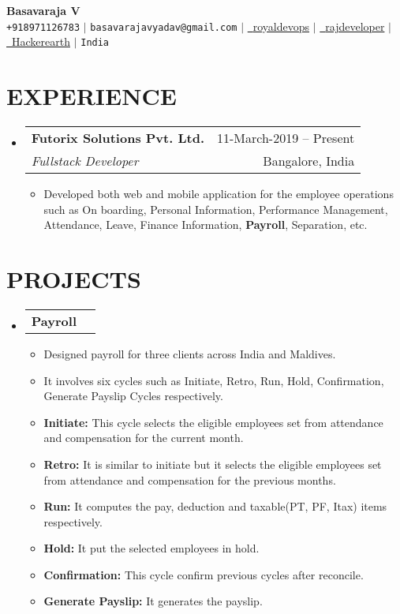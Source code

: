 \documentclass[letterpaper,11pt]{article}
\makeatletter
\newcommand{\resumeItem}[1]{
  \item\small{
    {#1 \vspace{-1pt}}
  }
}
\newcommand{\resumeSubheading}[4]{
  \vspace{-1pt}\item
    \begin{tabular*}{\textwidth}[t]{l@{\extracolsep{\fill}}r}
      \textbf{#1} & {\color{dark-grey}\small #2}\vspace{1pt}\\ %
      \textit{#3} & {\color{dark-grey} \small #4}\\ %
    \end{tabular*}\vspace{-4pt}
}
\newcommand{\resumeProjectHeading}[2]{
    \item
    \begin{tabular*}{\textwidth}{l@{\extracolsep{\fill}}r}
      #1 & {\color{dark-grey}} \\
    \end{tabular*}\vspace{-4pt}
}
\newcommand{\resumeSubHeadingListStart}{\begin{itemize}[leftmargin=0in, label={}]}
\newcommand{\resumeSubHeadingListEnd}{\end{itemize}}
\newcommand{\resumeItemListStart}{\begin{itemize}}
\newcommand{\resumeItemListEnd}{\end{itemize}\vspace{0pt}}
\makeatother
\begin{document}
\begin{center}
    \textbf{\Huge Basavaraja V} \\ \vspace{5pt}
    \small \faPhone* \texttt{+918971126783} \hspace{1pt} $|$
    \hspace{1pt} \faEnvelope \hspace{2pt} \texttt{basavarajavyadav@gmail.com} \hspace{1pt} $|$ 
    \href{https://linkedin.com/in//}{\raisebox{-0.2\height}\faLinkedin\ {royaldevops}} $|$
    \href{https://github.com/}{\raisebox{-0.2\height}\faGithub\ {rajdeveloper}} $|$
     \href{https://www.hackerearth.com/@basavarajav/}{\raisebox{-0.2\height}\ {Hackerearth}} $|$
    \hspace{1pt} \faMapMarker* \hspace{2pt}\texttt{India}
    \\ \vspace{-3pt}
\end{center}

\section{EXPERIENCE}
  \resumeSubHeadingListStart

    \resumeSubheading
      {Futorix Solutions Pvt. Ltd.}{11-March-2019 -- Present}
      {Fullstack Developer}{Bangalore, India}
      \resumeItemListStart
        \resumeItem{Developed both web and mobile application for the employee operations such as On boarding, Personal Information, Performance Management, Attendance, Leave, Finance Information, \textbf{Payroll}, Separation, etc.}
      \resumeItemListEnd
  \resumeSubHeadingListEnd


\section{PROJECTS}
    \resumeSubHeadingListStart
      \resumeProjectHeading
          {\textbf{Payroll}} {}
          \resumeItemListStart
            \resumeItem{Designed payroll for three clients across India and Maldives.}
            \resumeItem{It involves six cycles such as Initiate, Retro, Run, Hold, Confirmation, Generate Payslip Cycles respectively.}
            \resumeItem{\textbf{Initiate:} This cycle selects the eligible employees set from attendance and compensation for the current month.}
            \resumeItem{\textbf{Retro:} It is similar to initiate but it selects the eligible employees set from attendance and compensation for the previous months.}
            \resumeItem{\textbf{Run:} It computes the pay, deduction and taxable(PT, PF, Itax) items respectively.}
            \resumeItem{\textbf{Hold:} It put the selected employees in hold.}
            \resumeItem{\textbf{Confirmation:} This cycle confirm previous cycles after reconcile.}
            \resumeItem{\textbf{Generate Payslip:} It generates the payslip.}
          \resumeItemListEnd
    \resumeSubHeadingListEnd
\end{document}
